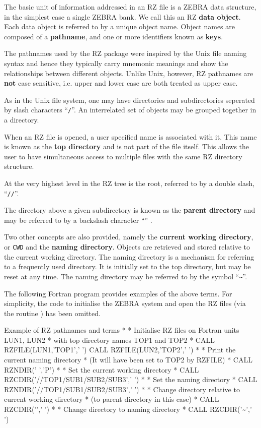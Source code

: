 The basic unit of information addressed in an RZ file
is a ZEBRA data structure, in the simplest case a single ZEBRA bank.
We call this an RZ
{\bf data object}.
Each data object is referred to by a unique object name.
Object names are composed of a
{\bf pathname}, and one or more identifiers known as {\bf keys}.

The pathnames used by the RZ package were inspired by
the Unix file naming syntax and hence they typically 
carry mnemonic meanings and show the relationships
between different objects.
Unlike Unix, however, RZ pathnames are {\bf not} case sensitive, i.e.
upper and lower case are both treated as upper case.

As in the Unix file system, one may have directories and subdirectories
seperated by slash characters ``{\tt/}''.
An interrelated set of objects may be grouped together in a directory.

When an RZ file is opened, a user specified name is associated with it.
This name is known as the {\bf top directory} and is not
part of the file itself. This allows the user to have simultaneous
access to multiple files with the same RZ directory structure.

At the very highest level in the RZ tree is the root, referred
to by a double slash, ``{\tt //}''.

The directory above a given subdirectory is known as the
{\bf parent directory} and may be referred to by a backslash
character ``\bs'' .

Two other concepts are also provided, namely the {\bf current working directory},
or {\tt CWD} and the {\bf naming directory}. Objects are retrieved
and stored relative to the current working directory. The naming directory
is a mechanism for referring to a frequently used directory. 
It is initially set to the top directory, but may be reset at any time.
The naming directory may be referred to by the symbol ``{\tt\~{}}''.

The following Fortran program provides examples of the above
terms. For simplicity, the code to initialise the ZEBRA system
and open the RZ files (via the routine ) has
been omitted.

\newpage
\begin{XMPt}{Example of RZ pathnames and terms}
*
*     Initialise RZ files on Fortran units LUN1, LUN2
*     with top directory names TOP1 and TOP2
*
      CALL RZFILE(LUN1,'TOP1',' ')
      CALL RZFILE(LUN2,'TOP2',' ')
*
*     Print the current naming directory
*     (It will have been set to TOP2 by RZFILE)
*
      CALL RZNDIR(' ','P')
*
*     Set the current working directory
*
      CALL RZCDIR('//TOP1/SUB1/SUB2/SUB3',' ')
*
*     Set the naming directory
*
      CALL RZNDIR('//TOP1/SUB1/SUB2/SUB3',' ')
*
*     Change directory relative to current working directory
*     (to parent directory in this case)
*
      CALL RZCDIR('\bs ',' ')
*
*     Change directory to naming directory
*
      CALL RZCDIR('\~{}',' ')
\end{XMPt}


